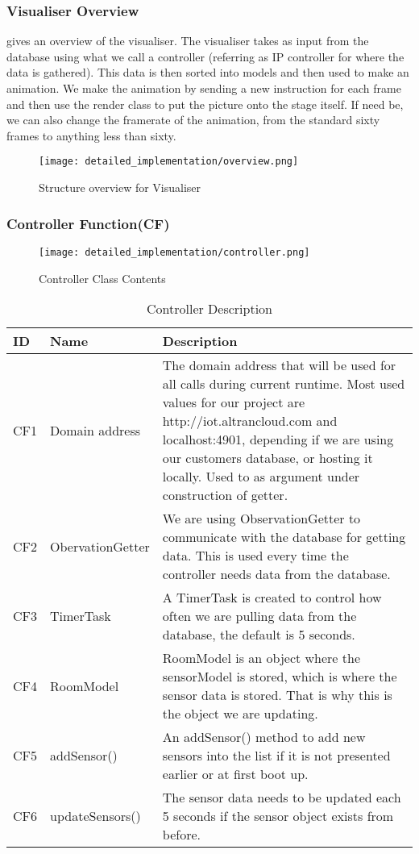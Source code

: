 \documentclass[../document]{subfiles}
\begin{document}
\subsubsection{Visualiser Overview}
 gives an overview of the visualiser. The visualiser takes as input from the database using what we call a controller (referring as IP controller for where the data is gathered). This data is then sorted into models and then used to make an animation. We make the animation by sending a new instruction for each frame and then use the render class to put the picture onto the stage itself. If need be, we can also change the framerate of the animation, from the standard sixty frames to anything less than sixty.

\begin{figure}[H]
\centering
\texttt{[image: detailed\_implementation/overview.png]}
\caption{Structure overview for Visualiser}
\label{fig:overview}
\end{figure}

\subsubsection{Controller Function(CF)}

\begin{figure}[H]
\centering
\texttt{[image: detailed\_implementation/controller.png]}
\caption{Controller Class Contents}
\end{figure}

\begin{table}[H]
\caption{Controller Description}
\centering
\begin{tabularx}{\textwidth}{|L{1.2cm}|L{3.5cm}|X|}
	\hline
	ID
	&Name
	&Description
	\\ \hline CF1
	&Domain address
	&The domain address that will be used for all calls during current runtime. Most used values for our project are http://iot.altrancloud.com and localhost:4901, depending if we are using our customers database, or hosting it locally. Used to as argument under construction of getter.
	\\ \hline CF2
	&ObervationGetter
	&We are using ObservationGetter to communicate with the database for getting data. This is used every time the controller needs data from the database.
	\\ \hline CF3
	&TimerTask
	&A TimerTask is created to control how often we are pulling data from the database, the default is 5 seconds.
	\\ \hline CF4
	&RoomModel
	&RoomModel is an object where the sensorModel is stored, which is where the sensor data is stored. That is why this is the object we are updating. 
	\\ \hline CF5
	&addSensor()
	&An addSensor() method to add new sensors into the list if it is not presented earlier or at first boot up.
	\\ \hline CF6
	&updateSensors()
	&The sensor data needs to be updated each 5 seconds if the sensor object exists from before.
	\\ \hline 
\end{tabularx}
\end{table}
\end{document}
